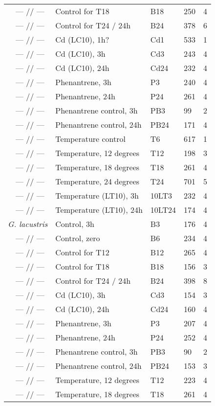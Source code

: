 \documentclass[12pt]{article}
\begin{document}
\begin{table}[H]
\begin{tabular}{lllll}
~~--- // --- & Control for T18 & B18 & 250 & 4 \\
~~--- // --- & Control for T24 / 24h & B24 & 378 & 6 \\
~~--- // --- & Cd (LC10), 1h? & Cd1 & 533 & 1 \\
~~--- // --- & Cd (LC10), 3h & Cd3 & 243 & 4 \\
~~--- // --- & Cd (LC10), 24h & Cd24 & 232 & 4 \\
~~--- // --- & Phenantrene, 3h & P3 & 240 & 4 \\
~~--- // --- & Phenantrene, 24h & P24 & 261 & 4 \\
~~--- // --- & Phenantrene control, 3h & PB3 & 99 & 2 \\
~~--- // --- & Phenantrene control, 24h & PB24 & 171 & 4 \\
~~--- // --- & Temperature control & T6 & 617  & 1 \\
~~--- // --- & Temperature, 12 degrees & T12 & 198 & 3 \\
~~--- // --- & Temperature, 18 degrees & T18 & 261 & 4 \\
~~--- // --- & Temperature, 24 degrees & T24 & 701 & 5 \\
~~--- // --- & Temperature (LT10), 3h & 10LT3 & 232 & 4 \\
~~--- // --- & Temperature (LT10), 24h & 10LT24 & 174 & 4 \\
\textit{G. lacustris} & Control, 3h & B3 & 176 & 4 \\
~~--- // --- & Control, zero & B6 & 234 & 4 \\
~~--- // --- & Control for T12 & B12 & 265 & 4 \\
~~--- // --- & Control for T18 & B18 & 156 & 3 \\
~~--- // --- & Control for T24 / 24h & B24 & 398 & 8 \\
~~--- // --- & Cd (LC10), 3h & Cd3 & 154 & 3 \\
~~--- // --- & Cd (LC10), 24h & Cd24 & 160 & 4 \\
~~--- // --- & Phenantrene, 3h & P3 & 207 & 4 \\
~~--- // --- & Phenantrene, 24h & P24 & 252 & 4 \\
~~--- // --- & Phenantrene control, 3h & PB3 & 90 & 2 \\
~~--- // --- & Phenantrene control, 24h & PB24 & 153 & 3 \\
~~--- // --- & Temperature, 12 degrees & T12 & 223 & 4 \\
~~--- // --- & Temperature, 18 degrees & T18 & 261 & 4 \\

\end{tabular}
\end{table}
\end{document}
